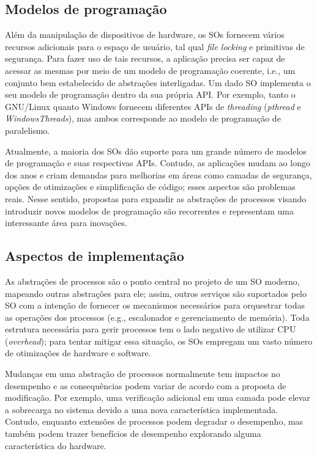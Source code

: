\subsection{Modelos de programação}

Além da manipulação de dispositivos de hardware, os SOs fornecem vários
recursos adicionais para o espaço de usuário, tal qual \emph{file locking} e
primitivas de segurança. Para fazer uso de tais recursos, a aplicação precisa
ser capaz de acessar as mesmas por meio de um modelo de programação coerente,
i.e., um conjunto bem estabelecido de abstrações interligadas. Um dado SO
implementa o seu modelo de programação dentro da sua própria API. Por exemplo,
tanto o GNU/Linux quanto Windows fornecem diferentes APIs de \emph{threading}
(\emph{pthread} e \emph{WindowsThreads}), mas ambos corresponde ao modelo de
programação de paralelismo.

Atualmente, a maioria dos SOs dão suporte para um grande número de modelos de
programação e suas respectivas APIs. Contudo, as aplicações mudam ao longo dos
anos e criam demandas para melhorias em áreas como camadas de segurança, opções
de otimizações e simplificação de código; esses aspectos são problemas reais.
Nesse sentido, propostas para expandir as abstrações de processos visando
introduzir novos modelos de programação são recorrentes e representam uma
interessante área para inovações.

\subsection{Aspectos de implementação}

As abstrações de processos são o ponto central no projeto de um SO moderno,
mapeando outras abstrações para ele; assim, outros serviços são suportados pelo
SO com a intenção de fornecer os mecanismos necessários para orquestrar todas
as operações dos processos (e.g., escalonador e gerenciamento de memória). Toda
estrutura necessária para gerir processos tem o lado negativo de utilizar CPU
(\emph{overhead}); para tentar mitigar essa situação, os SOs empregam um vasto
número de otimizações de hardware e software.

Mudanças em uma abstração de processos normalmente tem impactos no desempenho e
as consequências podem variar de acordo com a proposta de modificação. Por
exemplo, uma verificação adicional em uma camada pode elevar a sobrecarga no
sistema devido a uma nova característica implementada. Contudo, enquanto
extensões de processos podem degradar o desempenho, mas também podem trazer
benefícios de desempenho explorando alguma característica do hardware.

